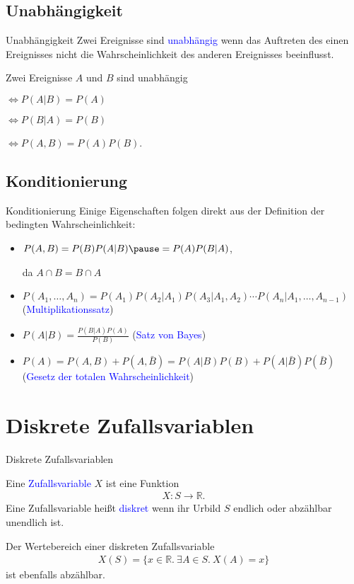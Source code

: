 \documentclass{beamer}
\def\padding{\vspace{0.5cm}}
\def\b{\textcolor{blue}}
\begin{document}
\subsection{Unabhängigkeit}
\begin{frame}{Unabhängigkeit}
    Zwei Ereignisse sind \b{unabhängig} wenn das Auftreten des einen Ereignisses nicht die Wahrscheinlichkeit des anderen Ereignisses beeinflusst.\pause\par\padding
    Zwei Ereignisse $A$ und $B$ sind unabhängig\par
    $\iff P(A|B) = P(A)$\pause\par
    $\iff P(B|A) = P(B)$\pause\par
    $\iff P(A,B) = P(A) P(B)$.
\end{frame}

\subsection{Konditionierung}
\begin{frame}{Konditionierung}
    Einige Eigenschaften folgen direkt aus der Definition der bedingten Wahrscheinlichkeit:\pause
    \begin{itemize}
        \item $P(A,B) = P(B) P(A|B)\pause = P(A) P(B|A)$,\par da $A \cap B = B \cap A$\pause
        \item $P(A_1, \dots, A_n) = P(A_1) P(A_2|A_1) P(A_3|A_1, A_2) \cdots P(A_n|A_1, \dots, A_{n-1})$ (\b{Multiplikationssatz})\pause
        \item $P(A|B) = \frac{P(B|A) P(A)}{P(B)}$ (\b{Satz von Bayes})\pause
        \item $P(A) = P(A,B) + P(A,\bar{B}) = P(A|B) P(B) + P(A|\bar{B}) P(\bar{B})$ (\b{Gesetz der totalen Wahrscheinlichkeit})
    \end{itemize}
\end{frame}

\section{Diskrete Zufallsvariablen}
\begin{frame}{Diskrete Zufallsvariablen}
    \begin{definition}
        Eine \b{Zufallsvariable} $X$ ist eine Funktion
        \begin{align*}
            X: S \to \mathbb{R}.
        \end{align*}\pause
        Eine Zufallsvariable heißt \b{diskret} wenn ihr Urbild $S$ endlich oder abzählbar unendlich ist.
    \end{definition}\pause\padding
    Der Wertebereich einer diskreten Zufallsvariable
    \begin{align*}
        X(S) = \{x \in \mathbb{R}.\ \exists A \in S.\ X(A) = x\}
    \end{align*}
    ist ebenfalls abzählbar.
\end{frame}
\end{document}
